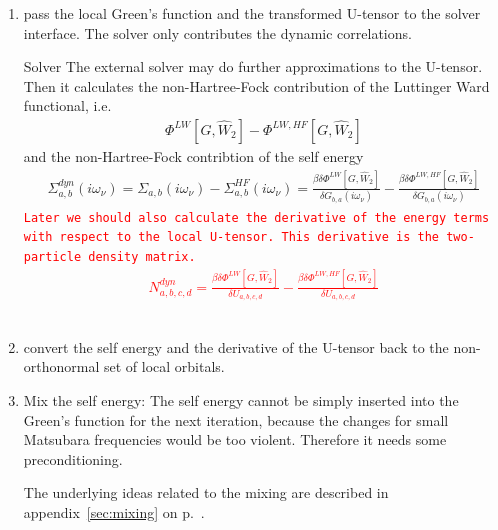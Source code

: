 \documentclass[11pt,a4paper]{report}
\newcommand{\petertt}[1]{\textcolor{red}{\texttt{#1}}}
\begin{document}
\begin{enumerate}
\item pass the local Green's function and the transformed U-tensor to
  the solver interface. The solver only contributes the dynamic
  correlations.
\begin{myshadowminipage}{Solver}
The external solver may do further approximations to the U-tensor.
Then it calculates the non-Hartree-Fock contribution of
the Luttinger Ward functional, i.e.
\begin{eqnarray}
\Phi^{LW}[G,\hat{W}_2]-\Phi^{LW,HF}[G,\hat{W}_2]
\end{eqnarray}
and the non-Hartree-Fock contribtion of the self energy
\begin{eqnarray}
\Sigma^{dyn}_{a,b}(i\omega_\nu)
=\Sigma_{a,b}(i\omega_\nu)-\Sigma^{HF}_{a,b}(i\omega_\nu)=
\frac{\beta\delta\Phi^{LW}[G,\hat{W}_2]}{\delta G_{b,a}(i\omega_\nu)}
-\frac{\beta\delta\Phi^{LW,HF}[G,\hat{W}_2]}{\delta G_{b,a}(i\omega_\nu)}
\end{eqnarray}
\petertt{Later we should also calculate the derivative of the energy
  terms with respect to the local U-tensor. This derivative is the
  two-particle density matrix.
\begin{eqnarray}
N^{dyn}_{a,b,c,d}=\frac{\beta\delta\Phi^{LW}[G,\hat{W}_2]}{\delta U_{a,b,c,d}}
-\frac{\beta\delta\Phi^{LW,HF}[G,\hat{W}_2]}{\delta U_{a,b,c,d}}
\end{eqnarray}
}
\end{myshadowminipage}
%
\item convert the self energy and the derivative of the U-tensor back
  to the non-orthonormal set of local orbitals.
%
\item Mix the self energy: The self energy cannot be simply
  inserted into the Green's function for the next iteration, because
  the changes for small Matsubara frequencies would be too
  violent. Therefore it needs some preconditioning.

  The underlying ideas related to the
  mixing are described in appendix~\ref{sec:mixing} on
  p.~\pageref{sec:mixing}.


\end{enumerate}
\end{document}
